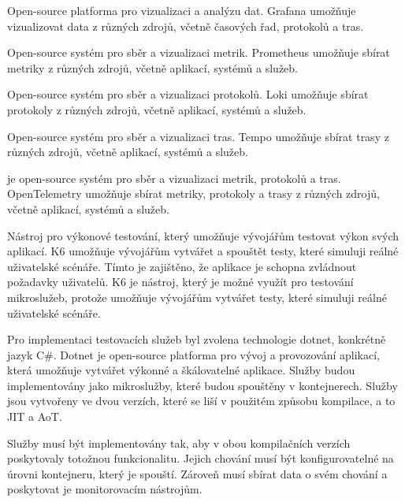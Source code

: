
Open-source platforma pro vizualizaci a analýzu dat. Grafana umožňuje vizualizovat data z různých zdrojů, včetně časových řad, protokolů a tras.

 
Open-source systém pro sběr a vizualizaci metrik. Prometheus umožňuje sbírat metriky z různých zdrojů, včetně aplikací, systémů a služeb.


Open-source systém pro sběr a vizualizaci protokolů. Loki umožňuje sbírat protokoly z různých zdrojů, včetně aplikací, systémů a služeb.


Open-source systém pro sběr a vizualizaci tras. Tempo umožňuje sbírat trasy z různých zdrojů, včetně aplikací, systémů a služeb.


je open-source systém pro sběr a vizualizaci metrik, protokolů a tras. OpenTelemetry umožňuje sbírat metriky, protokoly a trasy z různých zdrojů, včetně aplikací, systémů a služeb.



Nástroj pro výkonové testování, který umožňuje vývojářům testovat výkon svých aplikací. K6 umožňuje vývojářům vytvářet a spouštět testy, které simuluji reálné uživatelské scénáře. Tímto je zajištěno, že aplikace je schopna zvládnout požadavky uživatelů. K6 je nástroj, který je možné využít pro testování mikroslužeb, protože umožňuje vývojářům vytvářet testy, které simuluji reálné uživatelské scénáře.


Pro implementaci testovacích služeb byl zvolena technologie dotnet, konkrétně jazyk C\#. Dotnet je open-source platforma pro vývoj a provozování aplikací, která umožňuje vytvářet výkonné a škálovatelné aplikace. Služby budou implementovány jako mikroslužby, které budou spouštěny v kontejnerech. Služby jsou vytvořeny ve dvou verzích, které se liší v použitém způsobu kompilace, a to JIT a AoT.



Služby musí být implementovány tak, aby v obou kompilačních verzích poskytovaly totožnou funkcionalitu. Jejich chování musí být konfigurovatelné na úrovni kontejneru, který je spouští. Zároveň musí sbírat data o svém chování a poskytovat je monitorovacím nástrojům.

